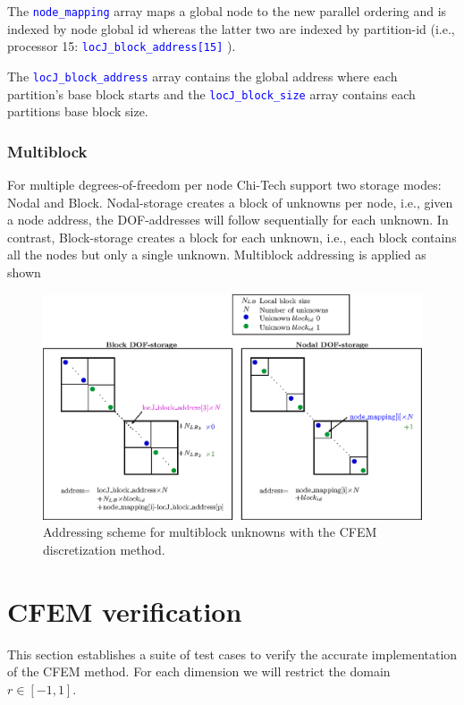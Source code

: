 \documentclass[11pt,letterpaper,titlepage]{article}
\newcommand{\xmltag}[1]{\textcolor{blue}{ \texttt{#1}} }
\numberwithin{equation}{section}
\begin{document}
The \xmltag{node\_mapping} array maps a global node to the new parallel ordering and is indexed by node global id whereas the latter two are indexed by partition-id (i.e., processor 15: \xmltag{locJ\_block\_address[15]} ). 

The \xmltag{locJ\_block\_address} array contains the global address where each partition's base block starts and the \xmltag{locJ\_block\_size} array contains each partitions base block size.


\subsubsection{Multiblock}
For multiple degrees-of-freedom per node Chi-Tech support two storage modes: Nodal and Block. Nodal-storage creates a block of unknowns per node, i.e., given a node address, the DOF-addresses will follow sequentially for each unknown. In contrast, Block-storage creates a block for each unknown, i.e., each
block contains all the nodes but only a single unknown. Multiblock addressing is applied as shown

\begin{figure}[H]
\centering
\includegraphics[width=1.0\linewidth]{Figures/DiscretizationComponentBlockCFEM}
\caption{Addressing scheme for multiblock unknowns with the CFEM discretization method.}
\label{fig:discretizationcomponentblockcfem}
\end{figure}



\newpage
\section{CFEM verification}
This section establishes a suite of test cases to verify the accurate implementation of the CFEM method. For each dimension we will restrict the domain $r \in [-1,1]$.
\end{document}
